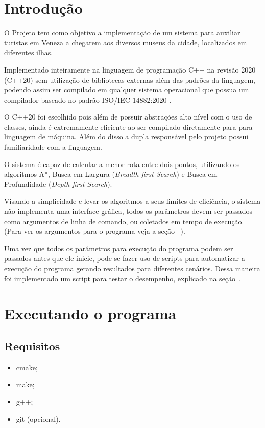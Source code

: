 \documentclass[12pt, a4paper]{article}
\begin{document}
\capa%
\tableofcontents%
\listoffigures\cleardoublepage%

\section{Introdução}\label{sec:intro}
O Projeto tem como objetivo a implementação de um sistema para auxiliar turistas em Veneza a chegarem aos diversos museus da cidade,
localizados em diferentes ilhas.

Implementado inteiramente na linguagem de programação C++ na revisão 2020 (C++20) sem utilização de bibliotecas externas além das padrões da linguagem,
podendo assim ser compilado em qualquer sistema operacional que possua um compilador baseado no padrão ISO/IEC 14882:2020 \cite{ISOC++20}.

O C++20 foi escolhido pois além de possuir abstrações alto nível com o uso de classes,
ainda é extremamente eficiente ao ser compilado diretamente para para linguagem de máquina.
Além do disso a dupla responsável pelo projeto possui familiaridade com a linguagem.

O sistema é capaz de calcular a menor rota entre dois pontos,
utilizando os algoritmos A*, Busca em Largura (\textit{Breadth-first Search}) e Busca em Profundidade (\textit{Depth-first Search}).

Visando a simplicidade e levar os algoritmos a seus limites de eficiência,
o sistema não implementa uma interface gráfica,
todos os parâmetros devem ser passados como argumentos de linha de comando,
ou coletados em tempo de execução. (Para ver os argumentos para o programa veja a seção~ ).

Uma vez que todos os parâmetros para execução do programa podem ser passados antes que ele inicie,
pode-se fazer uso de scripts para automatizar a execução do programa gerando resultados para diferentes cenários.
Dessa maneira foi implementado um script para testar o desempenho, explicado na seção~.

\section{Executando o programa}\label{sec:executando_programa}
\subsection{Requisitos}\label{sec:requisitos}
\begin{itemize}
    \item cmake;
    \item make;
    \item g++;
    \item git (opcional).
\end{itemize}
\end{document}
